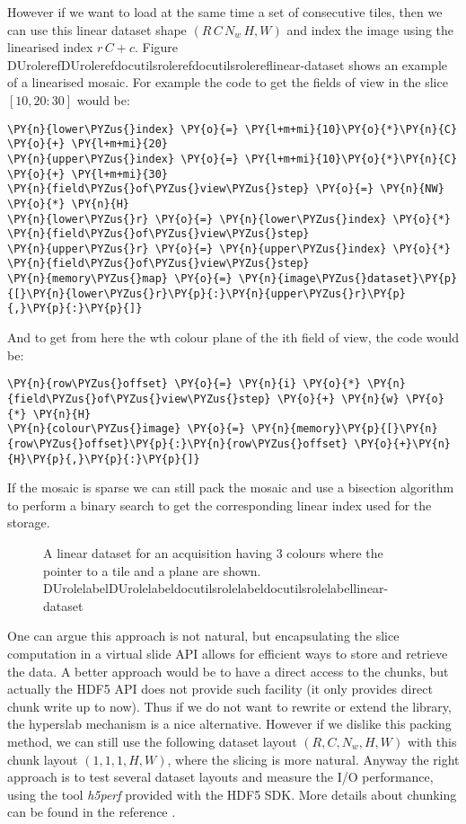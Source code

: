 \documentclass[letterpaper,compsoc,twoside]{IEEEtran}
\makeatletter
\def\PY@reset{\let\PY@it=\relax \let\PY@bf=\relax \let\PY@ul=\relax \let\PY@tc=\relax \let\PY@bc=\relax \let\PY@ff=\relax}
\def\PY@tok#1{\csname PY@tok@#1\endcsname}
\def\PY@toks#1+{\ifx\relax#1\empty\else \PY@tok{#1}\expandafter\PY@toks\fi}
\def\PY@do#1{\PY@bc{\PY@tc{\PY@ul{\PY@it{\PY@bf{\PY@ff{#1}}}}}}}
\def\PY#1#2{\PY@reset\PY@toks#1+\relax+\PY@do{#2}}
\def\PYZus{\char`\_}
\providecommand*{\DUrole}[2]{\ifcsname DUrole#1\endcsname \csname DUrole#1\endcsname{#2}\else \ifcsname docutilsrole#1\endcsname \csname docutilsrole#1\endcsname{#2}\else #2\fi \fi }
\makeatother
\begin{document}
However if we want to load at the same time a set of consecutive tiles, then we can use this
linear dataset shape $(R\,C\,N_w\,H,W)$ and index the image using the linearised index
$r\,C + c$. Figure \DUrole{ref}{linear-dataset} shows an example of a linearised mosaic. For example
the code to get the fields of view in the slice $[10,20:30]$ would be:\begin{Verbatim}[commandchars=\\\{\},fontsize=\footnotesize]
\PY{n}{lower\PYZus{}index} \PY{o}{=} \PY{l+m+mi}{10}\PY{o}{*}\PY{n}{C} \PY{o}{+} \PY{l+m+mi}{20}
\PY{n}{upper\PYZus{}index} \PY{o}{=} \PY{l+m+mi}{10}\PY{o}{*}\PY{n}{C} \PY{o}{+} \PY{l+m+mi}{30}
\PY{n}{field\PYZus{}of\PYZus{}view\PYZus{}step} \PY{o}{=} \PY{n}{NW} \PY{o}{*} \PY{n}{H}
\PY{n}{lower\PYZus{}r} \PY{o}{=} \PY{n}{lower\PYZus{}index} \PY{o}{*} \PY{n}{field\PYZus{}of\PYZus{}view\PYZus{}step}
\PY{n}{upper\PYZus{}r} \PY{o}{=} \PY{n}{upper\PYZus{}index} \PY{o}{*} \PY{n}{field\PYZus{}of\PYZus{}view\PYZus{}step}
\PY{n}{memory\PYZus{}map} \PY{o}{=} \PY{n}{image\PYZus{}dataset}\PY{p}{[}\PY{n}{lower\PYZus{}r}\PY{p}{:}\PY{n}{upper\PYZus{}r}\PY{p}{,}\PY{p}{:}\PY{p}{]}
\end{Verbatim}
And to get from here the wth colour plane of the ith field of view, the code would be:\begin{Verbatim}[commandchars=\\\{\},fontsize=\footnotesize]
\PY{n}{row\PYZus{}offset} \PY{o}{=} \PY{n}{i} \PY{o}{*} \PY{n}{field\PYZus{}of\PYZus{}view\PYZus{}step} \PY{o}{+} \PY{n}{w} \PY{o}{*} \PY{n}{H}
\PY{n}{colour\PYZus{}image} \PY{o}{=} \PY{n}{memory}\PY{p}{[}\PY{n}{row\PYZus{}offset}\PY{p}{:}\PY{n}{row\PYZus{}offset} \PY{o}{+}\PY{n}{H}\PY{p}{,}\PY{p}{:}\PY{p}{]}
\end{Verbatim}
If the mosaic is sparse we can still pack the mosaic and use a bisection algorithm to perform a binary
search to get the corresponding linear index used for the storage.\begin{figure}[bht]\noindent{}
\caption{A linear dataset for an acquisition having 3 colours where the pointer to a tile and a plane are
shown. \DUrole{label}{linear-dataset}}
\end{figure}

One can argue this approach is not natural, but encapsulating the slice computation in a virtual
slide API allows for efficient ways to store and retrieve the data. A better approach would be
to have a direct access to the chunks, but actually the HDF5 API does not provide such facility (it
only provides direct chunk write up to now). Thus if we do not want to rewrite or extend the
library, the hyperslab mechanism is a nice alternative. However if we dislike this packing method, we can
still use the following dataset layout $(R,C,N_w,H,W)$ with this chunk layout
$(1,1,1,H,W)$, where the slicing is more natural. Anyway the right approach is to test several
dataset layouts and measure the I/O performance, using the tool \emph{h5perf} provided with the HDF5 SDK.
More details about chunking can be found in the reference \cite{HDF5-Chunking}.
\end{document}
